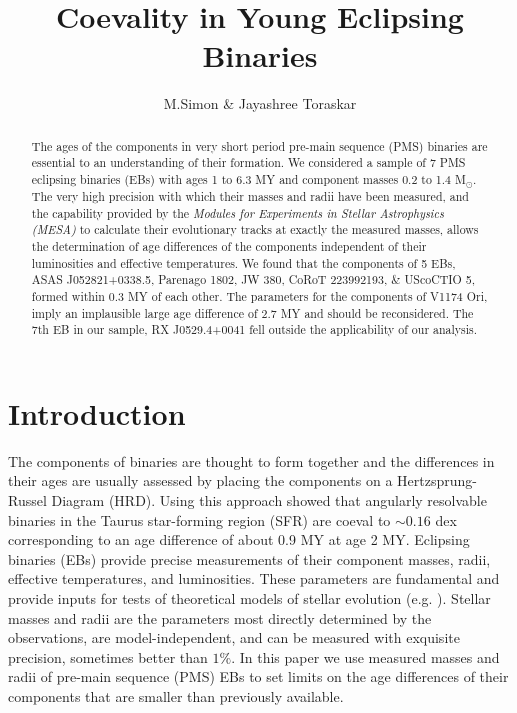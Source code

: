 \documentclass[12pt,preprint]{aastex6}
\begin{document}
\def \lsun          {\hbox{L$_{\odot}$}}
\def \msun          {\hbox{M$_\odot$}}
\def \rsun          {\hbox{R$_\odot$}}

\title{Coevality in Young Eclipsing Binaries}

\author{M.Simon \& Jayashree Toraskar} 


\begin{abstract}

The ages of the components in very short period pre-main sequence (PMS) 
binaries are essential to an understanding of their formation.
We considered a sample of 7 PMS eclipsing binaries (EBs)  with
ages 1 to 6.3 MY and component masses 0.2 to 1.4 \msun.  The very high 
precision with which their masses and radii have been measured, and
the capability provided by the 
{\it Modules for Experiments in Stellar Astrophysics (MESA)} 
to calculate their evolutionary tracks at exactly 
the measured masses, allows the determination of  age differences  of the 
components independent of their luminosities and effective temperatures.
We found that the components  of 5  EBs, ASAS J052821+0338.5, Parenago 1802,
JW 380, CoRoT 223992193, \& UScoCTIO 5, formed within 0.3 MY of each other. 
The parameters for the components of V1174 Ori, imply an implausible 
large age difference of 2.7 MY and should be reconsidered. The 7th EB in
our sample, RX J0529.4+0041 fell outside the applicability of our analysis.


\end{abstract}


\section{Introduction}

The components of binaries are thought to form together and the differences
in their ages are usually assessed  by placing the components on a 
Hertzsprung-Russel Diagram (HRD).  Using this 
approach \citet{2009ApJ...704..531K} 
showed that angularly resolvable binaries in the Taurus star-forming 
region (SFR) are coeval to $\sim 0.16$ dex corresponding to an age difference 
of about 0.9 MY at age 2 MY. Eclipsing binaries (EBs) provide precise
 measurements of their component masses, radii, effective temperatures, 
and luminosities.  These parameters are fundamental and provide inputs 
for tests of theoretical models of stellar evolution (e.g. 
\citet{2010A&Rv..18...67T}). Stellar masses and radii are the 
parameters most directly determined by the observations, are
model-independent, and can be measured with exquisite precision, sometimes 
better than  $1\%$.  In this paper we use  measured masses and radii 
of pre-main sequence (PMS) EBs to set limits on the age differences 
of their components that are smaller than previously available.
\end{document}
